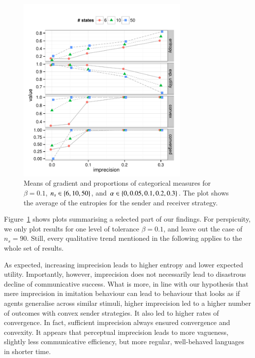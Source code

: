 \documentclass[11pt,english]{article}
\newcommand{\imprecision}{\ensuremath{\alpha}} %
\newcommand{\toler}{\ensuremath{\beta}} %
\newcommand{\ns}{\ensuremath{n_s}} %
\numberwithin{equation}{section}
\begin{document}
\begin{figure}[t]
  \centering
  
  \includegraphics[width=0.75\textwidth]{plots/MeanMetrics3.pdf}

  \caption{Means of gradient and proportions of categorical measures
    for $\toler = 0.1$, $\ns \in \set{6, 10, 50}$, and $\imprecision
    \in \set{0, 0.05, 0.1, 0.2, 0.3}$. The plot shows the average of
    the entropies for the sender and receiver strategy.}
  \label{fig:MeanMetrics}
\end{figure}

Figure~\ref{fig:MeanMetrics} shows plots summarising a selected part of our findings.  For
perspicuity, we only plot results for one level of tolerance $\beta = 0.1$, and leave out the
case of $n_s = 90$. Still, every qualitative trend mentioned in the following applies to the
whole set of results.

As expected, increasing imprecision leads to higher entropy and lower expected
utility. Importantly, however, imprecision does not necessarily lead to disastrous decline of
communicative success. What is more, in line with our hypothesis that mere imprecision in
imitation behaviour can lead to behaviour that looks as if agents generalise across similar
stimuli, higher imprecision led to a higher number of outcomes with convex sender
strategies. It also led to higher rates of convergence. In fact, sufficient imprecision always
ensured convergence and convexity. It appears that perceptual imprecision leads to more
vagueness, slightly less communicative efficiency, but more regular, well-behaved languages in
shorter time.
\end{document}
